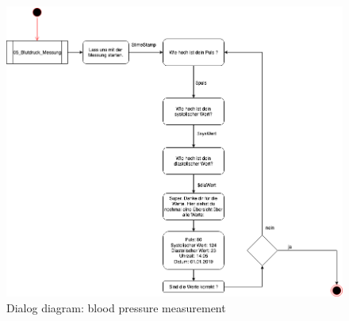 \begin{figure}[h]
	\centering
	\includegraphics[width=1\textwidth]{images/03_blutdruck_messung.png}
	\caption{Dialog diagram: blood pressure measurement}
	\label{dialog_diagram_03}
\end{figure}

